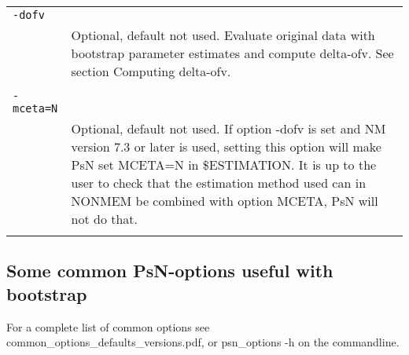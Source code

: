 \documentclass[a4paper,12pt]{article}
\begin{document}
\begin{longtable}{p{1in}p{4in}}
\\
\verb|-dofv| & \\
\nopagebreak
 & Optional, default not used. Evaluate original data with bootstrap parameter estimates and compute delta-ofv. See section Computing delta-ofv. \\
\\
\verb|-mceta=N| & \\
\nopagebreak
 & Optional, default not used. If option -dofv is set and NM version 7.3 or later is used, setting this option will make PsN set MCETA=N in \$ESTIMATION. It is up to the user to check that the estimation method used can in NONMEM be combined with option MCETA, PsN will not do that. \\
\\
\end{longtable}


\subsection{Some common PsN-options useful with bootstrap}

For a complete list of common options see common\_options\_defaults\_versions.pdf, or psn\_options -h on the commandline.
\end{document}
